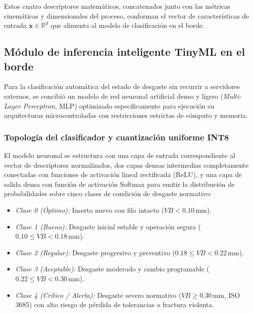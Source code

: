 Estos cuatro descriptores matemáticos, concatenados junto con las métricas cinemáticas y dimensionales del proceso, conforman el vector de características de entrada $\mathbf{x} \in \mathbb{R}^d$ que alimenta al modelo de clasificación en el borde.

\subsection{Módulo de inferencia inteligente TinyML en el borde}
\label{subsec:modulo_tinyml}

Para la clasificación automática del estado de desgaste sin recurrir a servidores externos, se concibió un modelo de red neuronal artificial denso y ligero (\textit{Multi-Layer Perceptron}, MLP) optimizado específicamente para ejecución en arquitecturas microcontroladas con restricciones estrictas de cómputo y memoria.

\subsubsection{Topología del clasificador y cuantización uniforme INT8}
El modelo neuronal se estructura con una capa de entrada correspondiente al vector de descriptores normalizados, dos capas densas intermedias completamente conectadas con funciones de activación lineal rectificada (ReLU), y una capa de salida densa con función de activación Softmax para emitir la distribución de probabilidades sobre cinco clases de condición de desgaste normativo:

{
\begin{itemize}[leftmargin=0.55cm, itemsep=2.0pt, parsep=0pt, topsep=2.5pt, partopsep=0pt]
    \item \textit{Clase 0 (Óptimo):} Inserto nuevo con filo intacto ($VB < 0.10\,\text{mm}$).
    \item \textit{Clase 1 (Bueno):} Desgaste inicial estable y operación segura ($0.10 \le VB < 0.18\,\text{mm}$).
    \item \textit{Clase 2 (Regular):} Desgaste progresivo y preventivo ($0.18 \le VB < 0.22\,\text{mm}$).
    \item \textit{Clase 3 (Aceptable):} Desgaste moderado y cambio programable ($0.22 \le VB < 0.30\,\text{mm}$).
    \item \textit{Clase 4 (Crítico / Alerta):} Desgaste severo normativo ($VB \ge 0.30\,\text{mm}$, ISO 3685) con alto riesgo de pérdida de tolerancias o fractura violenta.
\end{itemize}
}

